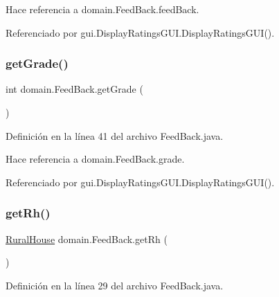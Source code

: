 Hace referencia a domain.\+Feed\+Back.\+feed\+Back.



Referenciado por gui.\+Display\+Ratings\+G\+U\+I.\+Display\+Ratings\+G\+U\+I().

\mbox{\label{classdomain_1_1_feed_back_af85865ec0c8e4dca3f11878326565bfa}} 
\subsubsection{\texorpdfstring{getGrade()}{getGrade()}}
{\footnotesize\ttfamily int domain.\+Feed\+Back.\+get\+Grade (\begin{DoxyParamCaption}{ }\end{DoxyParamCaption})}



Definición en la línea 41 del archivo Feed\+Back.\+java.


\begin{DoxyCode}{0}

\end{DoxyCode}


Hace referencia a domain.\+Feed\+Back.\+grade.



Referenciado por gui.\+Display\+Ratings\+G\+U\+I.\+Display\+Ratings\+G\+U\+I().

\mbox{\label{classdomain_1_1_feed_back_a0298aaa47399d95b96c64b4e1dfa872d}} 
\subsubsection{\texorpdfstring{getRh()}{getRh()}}
{\footnotesize\ttfamily \mbox{\hyperlink{classdomain_1_1_rural_house}{Rural\+House}} domain.\+Feed\+Back.\+get\+Rh (\begin{DoxyParamCaption}{ }\end{DoxyParamCaption})}



Definición en la línea 29 del archivo Feed\+Back.\+java.


